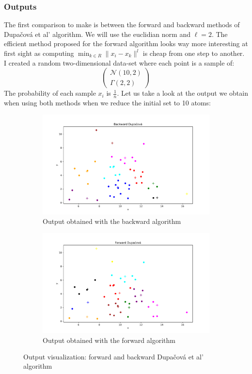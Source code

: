 \documentclass{amsart}
\begin{document}
\subsubsection{Outputs}
The first comparison to make is between the forward and backward methods of Dupačová et al' algorithm. We will use the euclidian norm and $\ell=2$. The efficient method proposed for the forward algorithm looks way more interesting at first sight as computing $\min_{k\in R}\lVert x_i-x_k\rVert^l$ is cheap from one step to another. I created a random two-dimensional data-set where each point is a sample of: $$
\begin{pmatrix}
    \mathcal{N}\left(10,2\right) \\ \Gamma\left(2,2\right)
\end{pmatrix}
$$
The probability of each sample $x_i$ is $\frac{1}{n}$. Let us take a look at the output we obtain when using both methods when we reduce the initial set to 10 atoms: 
\begin{figure}[ht]
    \centering
    \begin{subfigure}[b]{0.45\textwidth}
        \centering
        \includegraphics[width=\textwidth]{plots/dupacova backward.pdf}
        \caption{Output obtained with the backward algorithm}
        \label{result back}
    \end{subfigure}
    \hfill
    \begin{subfigure}[b]{0.45\textwidth}
        \centering
        \includegraphics[width=\textwidth]{plots/dupacova forward.pdf}
        \caption{Output obtained with the forward algorithm}
        \label{result forw}
    \end{subfigure}
    \caption{Output visualization: forward and backward Dupačová et al' algorithm}
\end{figure}
\end{document}
